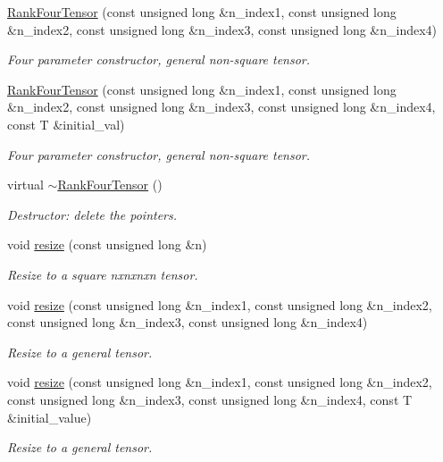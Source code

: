 \begin{DoxyCompactItemize}
\hyperlink{classoomph_1_1RankFourTensor_a24e7326e6ca5143f47d221ad7f45e7a6}{Rank\+Four\+Tensor} (const unsigned long \&n\+\_\+index1, const unsigned long \&n\+\_\+index2, const unsigned long \&n\+\_\+index3, const unsigned long \&n\+\_\+index4)
\begin{DoxyCompactList}\small\item\em Four parameter constructor, general non-\/square tensor. \end{DoxyCompactList}\item 
\hyperlink{classoomph_1_1RankFourTensor_ac23f09c14842914d318c594a2dd0d424}{Rank\+Four\+Tensor} (const unsigned long \&n\+\_\+index1, const unsigned long \&n\+\_\+index2, const unsigned long \&n\+\_\+index3, const unsigned long \&n\+\_\+index4, const T \&initial\+\_\+val)
\begin{DoxyCompactList}\small\item\em Four parameter constructor, general non-\/square tensor. \end{DoxyCompactList}\item 
virtual \hyperlink{classoomph_1_1RankFourTensor_a4165ed9adc8b0c0702a3a6d883cd9844}{$\sim$\+Rank\+Four\+Tensor} ()
\begin{DoxyCompactList}\small\item\em Destructor\+: delete the pointers. \end{DoxyCompactList}\item 
void \hyperlink{classoomph_1_1RankFourTensor_af70b319deb21a179326460b41def5aff}{resize} (const unsigned long \&n)
\begin{DoxyCompactList}\small\item\em Resize to a square nxnxnxn tensor. \end{DoxyCompactList}\item 
void \hyperlink{classoomph_1_1RankFourTensor_a57fbad42c64d5e452851730e64a2dfcf}{resize} (const unsigned long \&n\+\_\+index1, const unsigned long \&n\+\_\+index2, const unsigned long \&n\+\_\+index3, const unsigned long \&n\+\_\+index4)
\begin{DoxyCompactList}\small\item\em Resize to a general tensor. \end{DoxyCompactList}\item 
void \hyperlink{classoomph_1_1RankFourTensor_a26e0b2c9eb50816ec3f30e6bfeb39293}{resize} (const unsigned long \&n\+\_\+index1, const unsigned long \&n\+\_\+index2, const unsigned long \&n\+\_\+index3, const unsigned long \&n\+\_\+index4, const T \&initial\+\_\+value)
\begin{DoxyCompactList}\small\item\em Resize to a general tensor. \end{DoxyCompactList}\item 

\end{DoxyCompactItemize}
